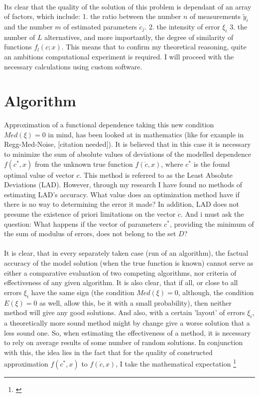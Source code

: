\\
Its clear that the quality of the solution of this problem is dependant of an array of factors, which include: 1. the ratio between the number $n$ of measurements $\tilde{y}_{i}$ and the number $m$ of estimated parameters $\dot{c}_{j}$. 2. the intensity of error $\xi_{i}$ 3. the number of $L$ alternatives, and more importantly, the degree of similarity of functions $f_{l}(c;x)$. This means that to confirm my theoretical reasoning, quite an ambitions computational experiment is required. I will proceed with the necessary calculations using custom software. 

\section{Algorithm}

Approximation of a functional dependence taking this new condition $Med(\xi)=0$ in mind, has been looked at in mathematics (like for example in Regg-Med-Noise, [citation needed]). It is believed that in this case it is necessary to minimize the sum of absolute values of deviations of the modelled dependence $f(c^{*},x)$ from the unknown true function $f(\dot{c},x)$, where $c^{*}$ is the found optimal value of  vector $c$. This method is referred to as the Least Absolute Deviations (LAD). However, through my research I have found no methods of estimating LAD's accuracy. What value does an optimization method have if there is no way to determining the error it made? In addition, LAD does not presume the existence of priori limitations on the vector $\dot{c}$. And i must ask the question: What happens if the vector of parameters $c^{*}$, providing the minimum of the sum of modulus of errors, does not belong to the set $D$? \\
\\
It is clear, that in every separately taken case (run of an algorithm), the factual accuracy of the model solution (when the true function is known) cannot serve as either a comparative evaluation of two competing algorithms, nor criteria of effectiveness of any given algorithm. It is also clear, that if all, or close to all errors $\xi_{i}$ have the same sign (the condition $Med(\xi)=0$, although, the condition $E(\xi)=0$ as well, allow this, be it with a small probability), then neither method will give any good solutions. And also, with a certain 'layout' of errors $\xi_{i}$, a theoretically more sound method might by change give a worse solution that a less sound one. So, when estimating the effectiveness of a method, it is necessary to rely on average results of some number of random solutions. In conjunction with this, the idea lies in the fact that for the quality of constructed approximation $f(c^{*},x)$ to $f(\dot{c},x)$, I take the mathematical expectation \footnote{\cite{Ross_2007}}

